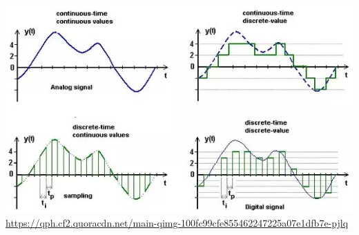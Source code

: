 \begin{minipage}{\linewidth}
    \centering
    \includegraphics[scale=0.5]{img/main-qimg-100fc99cfe855462247225a07e1dfb7e-pjlq.jpg}
    \url{https://qph.cf2.quoracdn.net/main-qimg-100fc99cfe855462247225a07e1dfb7e-pjlq}
    \label{fig:discretization}
\end{minipage}